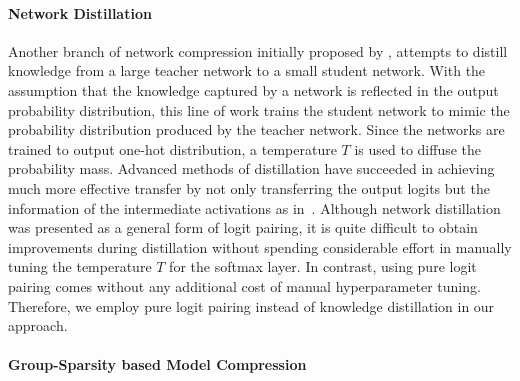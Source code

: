 \paragraph{Network Distillation}
Another branch of network compression initially proposed by \cite{hinton2015distilling}, attempts to distill knowledge from a large teacher network to a small student network. 
%
With the assumption that the knowledge captured by a network is reflected in the output probability distribution, this line of work trains the student network to mimic the probability distribution produced by the teacher network. Since the networks are trained to output one-hot distribution, a temperature $T$ is used to diffuse the probability mass.
%
Advanced methods of distillation have succeeded in achieving much more effective transfer by not only
transferring the output logits but the information of the intermediate activations as in~\cite{zagoruyko2016paying, romero2014fitnets, jang2019learning, ahn2019variational}.
Although network distillation was presented as a general form of logit pairing, it is quite difficult to obtain improvements during distillation without spending considerable effort in manually tuning the temperature $T$ for the softmax layer. In contrast, using pure logit pairing comes without any additional cost of manual hyperparameter tuning.
Therefore, we employ pure logit pairing instead of knowledge distillation in our approach.


%
%

\paragraph{Group-Sparsity based Model Compression}


